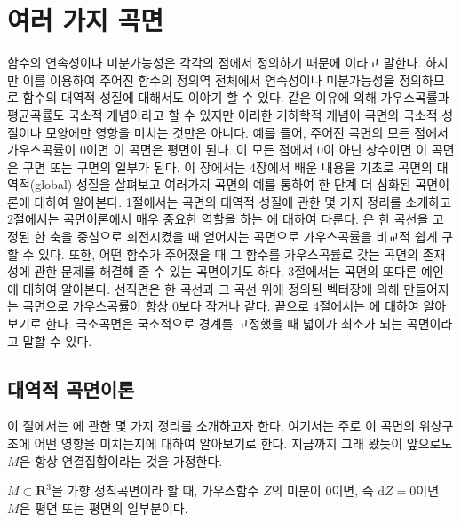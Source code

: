 \chapter{여러 가지 곡면}


함수의 연속성이나 미분가능성은 각각의 점에서 정의하기 때문에 이라고 말한다. 
하지만 이를 이용하여 주어진 함수의 정의역 전체에서 연속성이나 미분가능성을 정의하므로 함수의 대역적 성질에 대해서도 이야기 할 수 있다. 같은 이유에 의해 가우스곡률과 평균곡률도 국소적 개념이라고 할 수 있지만 이러한 기하학적 개념이 곡면의 국소적 성질이나 모양에만 영향을 미치는 것만은 아니다. 
예를 들어, 주어진 곡면의 모든 점에서 가우스곡률이 $0$이면 이 곡면은 평면이 된다. 이 모든 점에서 $0$이 아닌 상수이면 이 곡면은 구면 또는 구면의 일부가 된다. 이 장에서는 4장에서 배운 내용을 기초로 곡면의 대역적(global)
성질을 살펴보고 여러가지 곡면의 예를 통하여 한 단계 더 심화된
곡면이론에 대하여 알아본다. 1절에서는 곡면의 대역적 성질에 관한 몇 가지 정리를 소개하고 2절에서는 곡면이론에서 매우 중요한 역할을 하는 에 대하여 다룬다. 은 한 곡선을 고정된 한 축을 중심으로 회전시켰을 때 얻어지는
곡면으로 가우스곡률을 비교적 쉽게 구할 수 있다. 또한, 어떤 함수가 주어졌을 때 그 함수를 가우스곡률로 갖는 곡면의
존재성에 관한 문제를 해결해 줄 수 있는 곡면이기도 하다.
3절에서는 곡면의 또다른 예인 에 대하여 알아본다. 선직면은 한 곡선과 그 곡선 위에 정의된
벡터장에 의해 만들어지는 곡면으로 가우스곡률이 항상 $0$보다 작거나 같다. 끝으로 4절에서는
에 대하여 알아보기로 한다. 극소곡면은 국소적으로 경계를 고정했을 때 넓이가 최소가 되는 곡면이라고 말할 수 있다.



\section{대역적 곡면이론}

이 절에서는 에 관한 몇 가지 정리를
소개하고자 한다.
여기서는 주로 이 곡면의 위상구조에 어떤 영향을
미치는지에 대하여 알아보기로 한다.  지금까지 그래 왔듯이
앞으로도  $M$은 항상 연결집합이라는 것을 가정한다.

\begin{thm}[배꼽점]\label{thm511}
$M \subset \mathbf{R}^3$을 가향 정칙곡면이라 할 때,
가우스함수 $Z$의 미분이 $0$이면, 즉 $\mathrm{d}Z = 0$이면 $M$은 평면
또는 평면의 일부분이다.
\end{thm}


